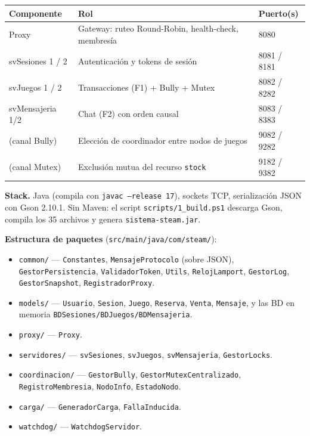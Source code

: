 \documentclass[11pt,a4paper]{article}
\newcommand{\codigo}[1]{\texttt{#1}}
\begin{document}
\begin{center}
\small
\begin{tabular}{l l l}
\hline
\textbf{Componente} & \textbf{Rol} & \textbf{Puerto(s)} \\
\hline
Proxy            & Gateway: ruteo Round-Robin, health-check, membresía & 8080 \\
svSesiones 1 / 2 & Autenticación y tokens de sesión & 8081 / 8181 \\
svJuegos 1 / 2   & Transacciones (F1) + Bully + Mutex & 8082 / 8282 \\
svMensajeria 1/2 & Chat (F2) con orden causal & 8083 / 8383 \\
(canal Bully)    & Elección de coordinador entre nodos de juegos & 9082 / 9282 \\
(canal Mutex)    & Exclusión mutua del recurso \codigo{stock} & 9182 / 9382 \\
\hline
\end{tabular}
\end{center}

\textbf{Stack.} Java (compila con \codigo{javac --release 17}), sockets TCP, serialización
JSON con Gson 2.10.1. Sin Maven: el script \codigo{scripts/1\_build.ps1} descarga Gson,
compila los 35 archivos y genera \codigo{sistema-steam.jar}.

\textbf{Estructura de paquetes} (\codigo{src/main/java/com/steam/}):
\begin{itemize}[leftmargin=1.4em,nosep]
  \item \codigo{common/} — \codigo{Constantes}, \codigo{MensajeProtocolo} (sobre JSON),
        \codigo{GestorPersistencia}, \codigo{ValidadorToken}, \codigo{Utils},
        \codigo{RelojLamport}, \codigo{GestorLog}, \codigo{GestorSnapshot}, \codigo{RegistradorProxy}.
  \item \codigo{models/} — \codigo{Usuario}, \codigo{Sesion}, \codigo{Juego}, \codigo{Reserva},
        \codigo{Venta}, \codigo{Mensaje}, y las BD en memoria \codigo{BDSesiones/BDJuegos/BDMensajeria}.
  \item \codigo{proxy/} — \codigo{Proxy}.
  \item \codigo{servidores/} — \codigo{svSesiones}, \codigo{svJuegos}, \codigo{svMensajeria}, \codigo{GestorLocks}.
  \item \codigo{coordinacion/} — \codigo{GestorBully}, \codigo{GestorMutexCentralizado},
        \codigo{RegistroMembresia}, \codigo{NodoInfo}, \codigo{EstadoNodo}.
  \item \codigo{carga/} — \codigo{GeneradorCarga}, \codigo{FallaInducida}.
  \item \codigo{watchdog/} — \codigo{WatchdogServidor}.
\end{itemize}
\end{document}
